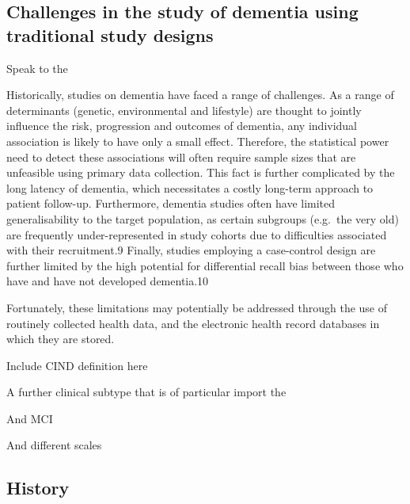 \documentclass[a4paper, twoside]{templates/ociamthesis}
\begin{document}
\hypertarget{challenges-in-the-study-of-dementia-using-traditional-study-designs}{%
\subsection{Challenges in the study of dementia using traditional study designs}\label{challenges-in-the-study-of-dementia-using-traditional-study-designs}}

Speak to the

Historically, studies on dementia have faced a range of challenges. As a range of determinants (genetic, environmental and lifestyle) are thought to jointly influence the risk, progression and outcomes of dementia, any individual association is likely to have only a small effect. Therefore, the statistical power need to detect these associations will often require sample sizes that are unfeasible using primary data collection.
This fact is further complicated by the long latency of dementia, which necessitates a costly long-term approach to patient follow-up. Furthermore, dementia studies often have limited generalisability to the target population, as certain subgroups (e.g.~the very old) are frequently under-represented in study cohorts due to difficulties associated with their recruitment.9 Finally, studies employing a case-control design are further limited by the high potential for differential recall bias between those who have and have not developed dementia.10

Fortunately, these limitations may potentially be addressed through the use of routinely collected health data, and the electronic health record databases in which they are stored.

Include CIND definition here

A further clinical subtype that is of particular import the

And MCI

And different scales

\hypertarget{history}{%
\subsection{History}\label{history}}
\end{document}
